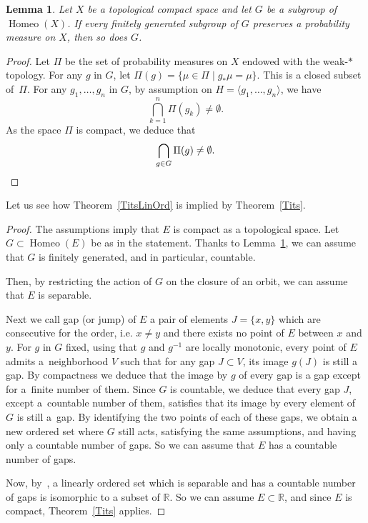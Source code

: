 \documentclass[10pt]{amsart}
\newtheorem{lemm}[theo]{Lemma}\newtheorem{prop}[theo]{Proposition}\newtheorem{coro}[theo]{Corollary}\newtheorem{conj}[theo]{Conjecture}
\theoremstyle{definition}\newtheorem{defi}[theo]{Definition}\newtheorem{rema}[theo]{Remark}\newtheorem{exam}[theo]{Example}\newtheorem{exem}[theo]{Example}\newtheorem{nota}[theo]{Notation}
\DeclareMathOperator{\Homeo}{Homeo}
\newcommand{\R}{\mathbb{R}}
\begin{document}
\begin{lemm}\label{reduction}
Let $X$ be a topological compact space and let $G$ be a subgroup of $\Homeo(X)$. If every finitely generated subgroup of $G$ preserves a probability measure on $X$, then so does $G$.
\end{lemm}

\begin{proof}
Let $\Pi$ be the set of probability measures on $X$ endowed with the weak-$*$ topology. For any $g$ in $G$, let $\Pi(g)=\{\mu\in \Pi\mid g_*\mu=\mu\}$. This is a closed subset of~$\Pi$. For any $g_1,\dots,g_n$ in $G$, by assumption on $H=\langle g_1,\dots, g_n\rangle$, we have
\[
\bigcap_{k=1}^n \Pi(g_k)\not=\emptyset.
\]
As the space $\Pi$ is compact, we deduce that
\[
\bigcap_{g\in G} \Pi(g)\not=\emptyset.\qedhere
\]
\end{proof}

Let us see how Theorem~\ref{TitsLinOrd} is implied by Theorem~\ref{Tits}.
\begin{proof}
The assumptions imply that $E$ is compact as a topological space. Let $G\subset \Homeo(E)$ be as in the statement. Thanks to Lemma~\ref{reduction}, we can assume that $G$ is finitely generated, and in particular, countable.

Then, by restricting the action of $G$ on the closure of an orbit, we can assume that $E$ is separable.

Next we call gap (or jump) of $E$ a pair of elements $J=\{x,y\}$ which are consecutive for the order, i.e. $x\not=y$ and there exists no point of $E$ between $x$ and $y$. For $g$ in $G$ fixed, using that $g$ and $g^{-1}$ are locally monotonic, every point of $E$ admits a~neighborhood $V$ such that for any gap $J\subset V$, its image $g(J)$ is still a gap. By compactness we deduce that the image by $g$ of every gap is a gap except for a~finite number of them. Since $G$ is countable, we deduce that every gap $J$, except a~countable number of them, satisfies that its image by every element of $G$ is still a~gap. By identifying the two points of each of these gaps, we obtain a new ordered set where $G$ still acts, satisfying the same assumptions, and having only a countable number of gaps. So we can assume that $E$ has a countable number of gaps.

Now, by~\cite{F}, a linearly ordered set which is separable and has a countable number of gaps is isomorphic to a subset of $\R$. So we can assume $E\subset \R$, and since $E$ is compact, Theorem~\ref{Tits} applies.
\end{proof}
\end{document}
